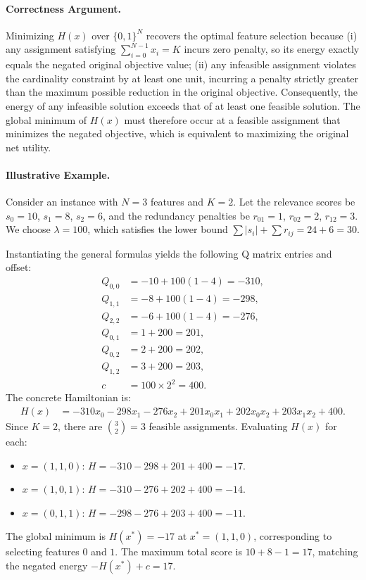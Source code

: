 \documentclass[12pt]{article}
\begin{document}
\paragraph{Correctness Argument.}
Minimizing $H(x)$ over $\{0,1\}^N$ recovers the optimal feature selection because (i) any assignment satisfying $\sum_{i=0}^{N-1} x_i = K$ incurs zero penalty, so its energy exactly equals the negated original objective value; (ii) any infeasible assignment violates the cardinality constraint by at least one unit, incurring a penalty strictly greater than the maximum possible reduction in the original objective. Consequently, the energy of any infeasible solution exceeds that of at least one feasible solution. The global minimum of $H(x)$ must therefore occur at a feasible assignment that minimizes the negated objective, which is equivalent to maximizing the original net utility.

\paragraph{Illustrative Example.}
Consider an instance with $N=3$ features and $K=2$. Let the relevance scores be $s_0 = 10$, $s_1 = 8$, $s_2 = 6$, and the redundancy penalties be $r_{01} = 1$, $r_{02} = 2$, $r_{12} = 3$. We choose $\lambda = 100$, which satisfies the lower bound $\sum |s_i| + \sum r_{ij} = 24 + 6 = 30$.

Instantiating the general formulas yields the following Q matrix entries and offset:
\begin{align}
    Q_{0,0} &= -10 + 100(1 - 4) = -310, \\
    Q_{1,1} &= -8 + 100(1 - 4) = -298, \\
    Q_{2,2} &= -6 + 100(1 - 4) = -276, \\
    Q_{0,1} &= 1 + 200 = 201, \\
    Q_{0,2} &= 2 + 200 = 202, \\
    Q_{1,2} &= 3 + 200 = 203, \\
    c &= 100 \times 2^2 = 400.
\end{align}
The concrete Hamiltonian is:
\begin{align}
    H(x) &= -310 x_0 - 298 x_1 - 276 x_2 + 201 x_0 x_1 + 202 x_0 x_2 + 203 x_1 x_2 + 400.
\end{align}
Since $K=2$, there are $\binom{3}{2}=3$ feasible assignments. Evaluating $H(x)$ for each:
\begin{itemize}
    \item $x = (1,1,0)$: $H = -310 - 298 + 201 + 400 = -17$.
    \item $x = (1,0,1)$: $H = -310 - 276 + 202 + 400 = -14$.
    \item $x = (0,1,1)$: $H = -298 - 276 + 203 + 400 = -11$.
\end{itemize}
The global minimum is $H(x^*) = -17$ at $x^* = (1,1,0)$, corresponding to selecting features $0$ and $1$. The maximum total score is $10 + 8 - 1 = 17$, matching the negated energy $-H(x^*) + c = 17$.
\end{document}
